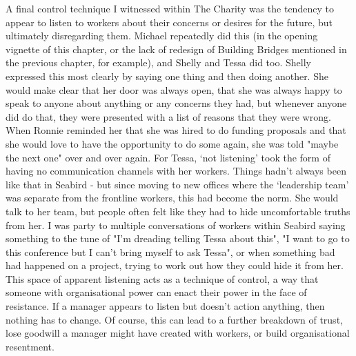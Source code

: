 A final control technique I witnessed within The Charity was the tendency to appear to listen to workers about their concerns or desires for the future, but ultimately disregarding them. Michael repeatedly did this (in the opening vignette of this chapter, or the lack of redesign of Building Bridges mentioned in the previous chapter, for example), and Shelly and Tessa did too. Shelly expressed this most clearly by saying one thing and then doing  another. She would make clear that her door was always open, that she was always happy to speak to anyone about anything or any concerns they had, but whenever anyone did do that, they were presented with a list of reasons that they were wrong. When Ronnie reminded her that she was hired to do funding proposals and that she would love to have the opportunity to do some again, she was told "maybe the next one" over and over again. For Tessa, ‘not listening’ took the form of having no communication channels with her workers. Things hadn’t always been like that in Seabird - but since moving to new offices where the ‘leadership team’ was separate from the frontline workers, this had become the norm. She would talk to her team, but people often felt like they had to hide uncomfortable truths from her. I was party to multiple conversations of workers within Seabird saying something to the tune of "I'm dreading telling Tessa about this", "I want to go to this conference but I can't bring myself to ask Tessa", or when something bad had happened on a project, trying to work out how they could hide it from her. This space of apparent listening acts as a technique of control, a way that someone with organisational power can enact their power in the face of resistance. If a manager appears to listen but doesn't action anything, then nothing has to change. Of course, this can lead to a further breakdown of trust, lose goodwill a manager might have created with workers, or build organisational resentment.

